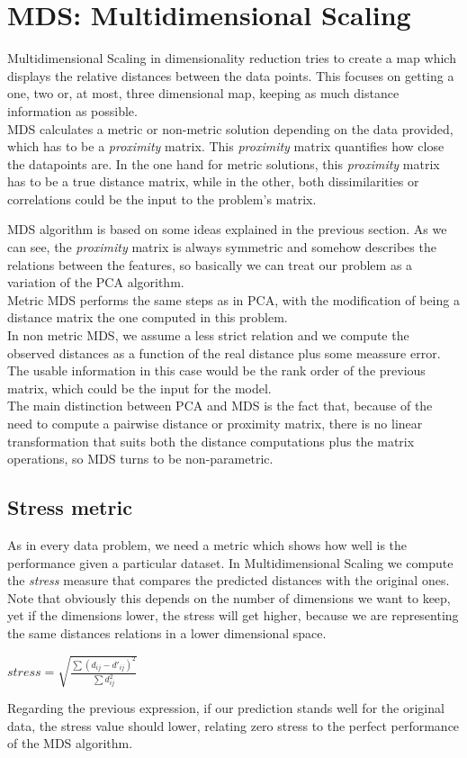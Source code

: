 \documentclass[a4paper,11pt,spanish]{report}
\begin{document}
\section{MDS: Multidimensional Scaling}
\label{sec:mds}

Multidimensional Scaling in dimensionality reduction tries to create a map which displays the relative distances between the data points. This focuses on getting a one, two or, at most, three dimensional map, keeping as much distance information as possible.\\
MDS calculates a metric or non-metric solution depending on the data provided, which has to be a \textit{proximity} matrix. This \textit{proximity} matrix quantifies how close the datapoints are. In the one hand for metric solutions, this \textit{proximity} matrix has to be a true distance matrix, while in the other, both dissimilarities or correlations could be the input to the problem's matrix.

MDS algorithm is based on some ideas explained in the previous section. As we can see, the \textit{proximity} matrix is always  symmetric and somehow describes the relations between the features, so basically we can treat our problem as a variation of the PCA algorithm.\\
Metric MDS performs the same steps as in PCA, with the modification of being a distance matrix the one computed in this problem.\\
In non metric MDS, we assume a less strict relation and we compute the observed distances as a function of the real distance plus some meassure error. The usable information in this case would be the rank order of the previous matrix, which could be the input for the model.\\
The main distinction between PCA and MDS is the fact that, because of the need to compute a pairwise distance or proximity matrix, there is no linear transformation that suits both the distance computations plus the matrix operations, so MDS turns to be non-parametric.

\subsection{Stress metric}
\label{ssec:str}

As in every data problem, we need a metric which shows how well is the performance given a particular dataset. In Multidimensional Scaling we compute the \textit{stress} measure that compares the predicted distances with the original ones. Note that obviously this depends on the number of dimensions we want to keep, yet if the dimensions lower, the stress will get higher, because we are representing the same distances relations in a lower dimensional space.
\begin{center}
\( \textit{stress} = \sqrt{\frac{\sum(d_{ij}-d'_{ij})^{2}}{\sum d_{ij}^{2}} } \)
\end{center}
Regarding the previous expression, if our prediction stands well for the original data, the stress value should lower, relating zero stress to the perfect performance of the MDS  algorithm. 
\end{document}
